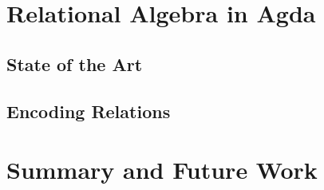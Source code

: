 \documentclass{report}
\begin{document}
\chapter{Relational Algebra in Agda}
\label{chap:relationalalgebrainagda}


  \section{State of the Art}
  \label{sec:relalg_sota}
  

  \section{Encoding Relations}
  \label{chap:relationalalgebra}
  
  
%

\chapter{Summary and Future Work}
\label{chap:futurework}




\end{document}
